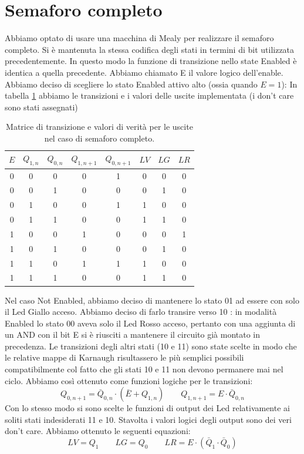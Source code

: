 \documentclass[10pt,a4paper]{article}
\begin{document}
\section{Semaforo completo}
Abbiamo optato di usare una macchina di Mealy per realizzare il semaforo completo. Si è mantenuta la stessa codifica degli stati in termini di bit utilizzata precedentemente. In questo modo la funzione di transizione nello state Enabled è identica a quella precedente. Abbiamo chiamato E il valore logico dell'enable.
Abbiamo deciso di scegliere lo stato Enabled attivo alto (ossia quando $E = 1$):%
In tabella \ref{tab:semaforocompleto} abbiamo le transizioni e i valori delle uscite implementata (i don't care sono stati assegnati)
\begin{table}
\centering
\begin{tabular}{|c||c|c||c|c||c|c|c|}
\hline
$E$ & $Q_{1,n}$ & $Q_{0, n}$ & $Q_{1, n+1}$ & $Q_{0, n+1}$ & $LV$ & $LG$ & $LR$\\
\hline
0 & 0 & 0 & 0 & 1 & 0 & 0 & 0 \\
0 & 0 & 1 & 0 & 0 & 0 & 1 & 0\\
0 & 1 & 0 & 0 & 1 & 1 & 0 & 0\\
0 & 1 & 1 & 0 & 0 & 1 & 1 & 0\\
\hline
1 & 0 & 0 & 1 & 0 & 0 & 0 & 1 \\
1 & 0 & 1 & 0 & 0 & 0 & 1 & 0\\
1 & 1 & 0 & 1 & 1 & 1 & 0 & 0\\
1 & 1 & 1 & 0 & 0 & 1 & 1 & 0\\
\hline
\end{tabular}
\caption{Matrice di transizione e valori di verità per le uscite nel caso di semaforo completo.\label{tab:semaforocompleto}}
\end{table} 
Nel caso Not Enabled, abbiamo deciso di mantenere lo stato 01 ad essere con solo il Led Giallo acceso. Abbiamo deciso di farlo transire verso 10 : in modalità Enabled lo stato 00 aveva solo il Led Rosso acceso, pertanto con una aggiunta di un AND con il bit E si è riusciti a mantenere il circuito già montato in precedenza. Le transizioni degli altri stati (10 e 11) sono state scelte in modo che le relative mappe di Karnaugh risultassero le più semplici possibili compatibilmente col fatto che gli stati 10 e 11 non devono permanere mai nel ciclo.
Abbiamo così ottenuto come funzioni logiche per le transizioni:
\begin{equation}
Q_{0, n+1} = \bar{Q}_{0,n}\cdot(\bar{E}+Q_{1,n})\qquad
Q_{1, n+1} = E\cdot \bar{Q}_{0, n}
\end{equation}
Con lo stesso modo si sono scelte le funzioni di output dei Led relativamente ai soliti stati indesiderati 11 e 10. Stavolta i valori logici degli output sono dei veri don't care. Abbiamo ottenuto le seguenti equazioni:
\begin{equation}
LV = Q_1\qquad LG = Q_0\qquad LR = E\cdot(\bar{Q}_1\cdot\bar{Q}_0)
\end{equation}
\end{document}
